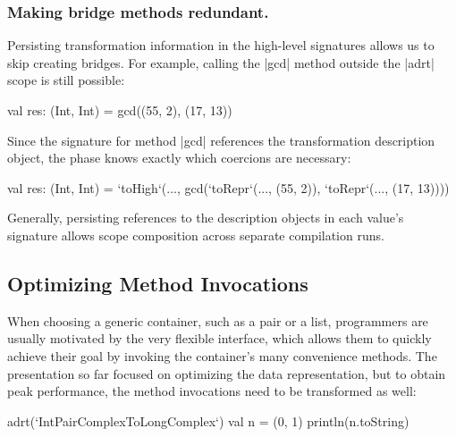 \subsubsection{Making bridge methods redundant.} Persisting transformation information in the high-level signatures allows us to skip creating bridges. For example, calling the |gcd| method outside the |adrt| scope is still possible:

\begin{lstlisting-nobreak}
val res: (Int, Int) = gcd((55, 2), (17, 13))
\end{lstlisting-nobreak}

Since the signature for method |gcd| references the transformation description object, the \coerce{} phase knows exactly which coercions are necessary:

\begin{lstlisting-nobreak}
val res: (Int, Int) = `toHigh`(...,
  gcd(`toRepr`(..., (55, 2)), `toRepr`(..., (17, 13))))
\end{lstlisting-nobreak}

Generally, persisting references to the description objects in each value's signature allows scope composition across separate compilation runs.%


\subsection{Optimizing Method Invocations}
\label{sec:ildl:method}

When choosing a generic container, such as a pair or a list, programmers are usually motivated by the very flexible interface, which allows them to quickly achieve their goal by invoking the container's many convenience methods. The presentation so far focused on optimizing the data representation, but to obtain peak performance, the method invocations need to be transformed as well:

\begin{lstlisting-nobreak}
adrt(`IntPairComplexToLongComplex`) {
  val n = (0, 1)
  println(n.toString)
}
\end{lstlisting-nobreak}

